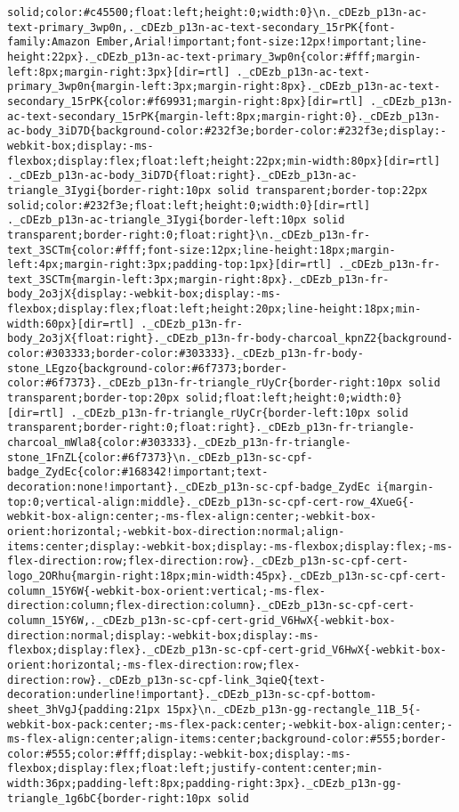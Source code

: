 \documentclass[
]{article}
\begin{document}
\begin{verbatim}
solid;color:#c45500;float:left;height:0;width:0}\n._cDEzb_p13n-ac-text-primary_3wp0n,._cDEzb_p13n-ac-text-secondary_15rPK{font-family:Amazon Ember,Arial!important;font-size:12px!important;line-height:22px}._cDEzb_p13n-ac-text-primary_3wp0n{color:#fff;margin-left:8px;margin-right:3px}[dir=rtl] ._cDEzb_p13n-ac-text-primary_3wp0n{margin-left:3px;margin-right:8px}._cDEzb_p13n-ac-text-secondary_15rPK{color:#f69931;margin-right:8px}[dir=rtl] ._cDEzb_p13n-ac-text-secondary_15rPK{margin-left:8px;margin-right:0}._cDEzb_p13n-ac-body_3iD7D{background-color:#232f3e;border-color:#232f3e;display:-webkit-box;display:-ms-flexbox;display:flex;float:left;height:22px;min-width:80px}[dir=rtl] ._cDEzb_p13n-ac-body_3iD7D{float:right}._cDEzb_p13n-ac-triangle_3Iygi{border-right:10px solid transparent;border-top:22px solid;color:#232f3e;float:left;height:0;width:0}[dir=rtl] ._cDEzb_p13n-ac-triangle_3Iygi{border-left:10px solid transparent;border-right:0;float:right}\n._cDEzb_p13n-fr-text_3SCTm{color:#fff;font-size:12px;line-height:18px;margin-left:4px;margin-right:3px;padding-top:1px}[dir=rtl] ._cDEzb_p13n-fr-text_3SCTm{margin-left:3px;margin-right:8px}._cDEzb_p13n-fr-body_2o3jX{display:-webkit-box;display:-ms-flexbox;display:flex;float:left;height:20px;line-height:18px;min-width:60px}[dir=rtl] ._cDEzb_p13n-fr-body_2o3jX{float:right}._cDEzb_p13n-fr-body-charcoal_kpnZ2{background-color:#303333;border-color:#303333}._cDEzb_p13n-fr-body-stone_LEgzo{background-color:#6f7373;border-color:#6f7373}._cDEzb_p13n-fr-triangle_rUyCr{border-right:10px solid transparent;border-top:20px solid;float:left;height:0;width:0}[dir=rtl] ._cDEzb_p13n-fr-triangle_rUyCr{border-left:10px solid transparent;border-right:0;float:right}._cDEzb_p13n-fr-triangle-charcoal_mWla8{color:#303333}._cDEzb_p13n-fr-triangle-stone_1FnZL{color:#6f7373}\n._cDEzb_p13n-sc-cpf-badge_ZydEc{color:#168342!important;text-decoration:none!important}._cDEzb_p13n-sc-cpf-badge_ZydEc i{margin-top:0;vertical-align:middle}._cDEzb_p13n-sc-cpf-cert-row_4XueG{-webkit-box-align:center;-ms-flex-align:center;-webkit-box-orient:horizontal;-webkit-box-direction:normal;align-items:center;display:-webkit-box;display:-ms-flexbox;display:flex;-ms-flex-direction:row;flex-direction:row}._cDEzb_p13n-sc-cpf-cert-logo_2ORhu{margin-right:18px;min-width:45px}._cDEzb_p13n-sc-cpf-cert-column_15Y6W{-webkit-box-orient:vertical;-ms-flex-direction:column;flex-direction:column}._cDEzb_p13n-sc-cpf-cert-column_15Y6W,._cDEzb_p13n-sc-cpf-cert-grid_V6HwX{-webkit-box-direction:normal;display:-webkit-box;display:-ms-flexbox;display:flex}._cDEzb_p13n-sc-cpf-cert-grid_V6HwX{-webkit-box-orient:horizontal;-ms-flex-direction:row;flex-direction:row}._cDEzb_p13n-sc-cpf-link_3qieQ{text-decoration:underline!important}._cDEzb_p13n-sc-cpf-bottom-sheet_3hVgJ{padding:21px 15px}\n._cDEzb_p13n-gg-rectangle_11B_5{-webkit-box-pack:center;-ms-flex-pack:center;-webkit-box-align:center;-ms-flex-align:center;align-items:center;background-color:#555;border-color:#555;color:#fff;display:-webkit-box;display:-ms-flexbox;display:flex;float:left;justify-content:center;min-width:36px;padding-left:8px;padding-right:3px}._cDEzb_p13n-gg-triangle_1g6bC{border-right:10px solid 
\end{verbatim}
\end{document}
